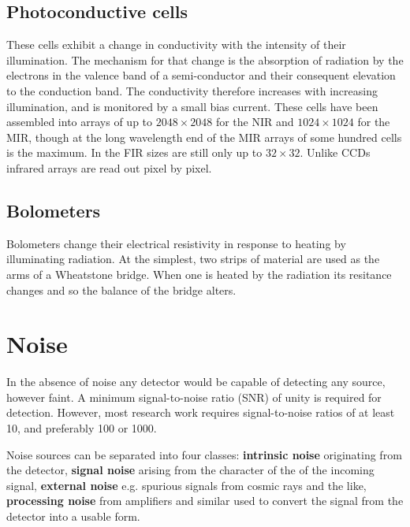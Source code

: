 \subsection{Photoconductive cells}
These cells exhibit a change in conductivity with the 
intensity of their illumination. The mechanism for that change is the 
absorption of radiation by the electrons in the valence band of a 
semi-conductor and their consequent elevation to the conduction band. The
conductivity therefore increases with increasing illumination, and is monitored
by a small bias current. These cells have been assembled into arrays of 
up to $2048\times 2048$ for the NIR and $1024\times 1024$ for the MIR, 
though at the long wavelength end of the MIR arrays of some hundred cells is
the maximum. In the FIR sizes are still only up to $32\times 32$. Unlike
CCDs infrared arrays are read out pixel by pixel. 

\subsection{Bolometers}
Bolometers change their electrical
resistivity in response to heating by illuminating radiation. At the
simplest, two strips of material are used as the arms of a Wheatstone
bridge. When one is heated by the radiation its resitance changes and
so the balance of the bridge alters. 

\section{Noise}

In the absence of noise any detector would be capable of detecting any source,
however faint. A minimum signal-to-noise ratio (SNR) of unity is required for 
detection. However, most research work requires signal-to-noise ratios of
at least 10, and preferably 100 or 1000. 

Noise sources can be separated into four classes: {\bf intrinsic noise} 
originating from the detector, {\bf signal noise} arising from the character
of the of the incoming signal, {\bf external noise} e.g. spurious signals
from cosmic rays and the like, {\bf processing noise} from amplifiers and
similar used to convert the signal from the detector into a usable form.

